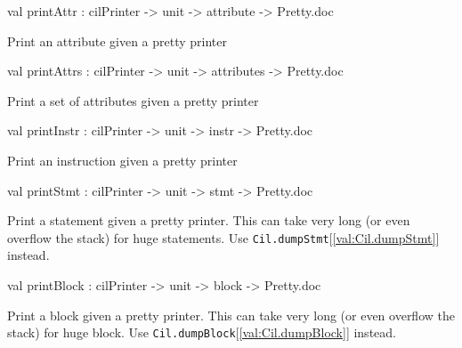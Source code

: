\documentclass[11pt]{article}
\begin{document}
\label{val:Cil.printAttr}\begin{ocamldoccode}
val printAttr : cilPrinter -> unit -> attribute -> Pretty.doc
\end{ocamldoccode}
\begin{ocamldocdescription}
Print an attribute given a pretty printer


\end{ocamldocdescription}




\label{val:Cil.printAttrs}\begin{ocamldoccode}
val printAttrs : cilPrinter -> unit -> attributes -> Pretty.doc
\end{ocamldoccode}
\begin{ocamldocdescription}
Print a set of attributes given a pretty printer


\end{ocamldocdescription}




\label{val:Cil.printInstr}\begin{ocamldoccode}
val printInstr : cilPrinter -> unit -> instr -> Pretty.doc
\end{ocamldoccode}
\begin{ocamldocdescription}
Print an instruction given a pretty printer


\end{ocamldocdescription}




\label{val:Cil.printStmt}\begin{ocamldoccode}
val printStmt : cilPrinter -> unit -> stmt -> Pretty.doc
\end{ocamldoccode}
\begin{ocamldocdescription}
Print a statement given a pretty printer. This can take very long 
 (or even overflow the stack) for huge statements. Use {\tt{Cil.dumpStmt}}[\ref{val:Cil.dumpStmt}] 
 instead.


\end{ocamldocdescription}




\label{val:Cil.printBlock}\begin{ocamldoccode}
val printBlock : cilPrinter -> unit -> block -> Pretty.doc
\end{ocamldoccode}
\begin{ocamldocdescription}
Print a block given a pretty printer. This can take very long 
 (or even overflow the stack) for huge block. Use {\tt{Cil.dumpBlock}}[\ref{val:Cil.dumpBlock}] 
 instead.


\end{ocamldocdescription}
\end{document}
